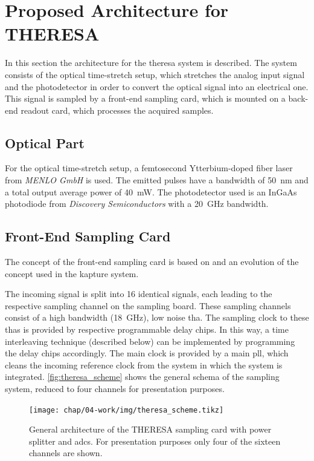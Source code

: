 \section{Proposed Architecture for THERESA}
In this section the architecture for the \gls{theresa} system is described.
The system consists of the optical time-stretch setup, which stretches the analog input signal and the photodetector in order to convert the optical signal into an electrical one.
This signal is sampled by a front-end sampling card, which is mounted on a back-end readout card, which processes the acquired samples.

\subsection*{Optical Part}
For the optical time-stretch setup, a femtosecond Ytterbium-doped fiber laser from \textit{MENLO GmbH} is used. The emitted pulses have a bandwidth of \SI{50}{\nano \meter} and a total output average power of \SI{40}{\milli \watt}.
The photodetector used is an InGaAs photodiode from \textit{Discovery Semiconductors} with a \SI{20}{\GHz} bandwidth.

\subsection{Front-End Sampling Card}
The concept of the front-end sampling card is based on and an evolution of the concept used in the \gls{kapture} system. 

The incoming signal is split into 16 identical signals, each leading to the respective sampling channel on the sampling board.
These sampling channels consist of a high bandwidth (\SI{18}{\GHz}), low noise \gls{tha}.
The sampling clock to these \glspl{tha} is provided by respective programmable delay chips.
In this way, a time interleaving technique (described below) can be implemented by programming the delay chips accordingly. 
The main clock is provided by a main \gls{pll}, which cleans the incoming reference clock from the system in which the system is integrated.
\autoref{fig:theresa_scheme} shows the general schema of the sampling system, reduced to four channels for presentation purposes.
\begin{figure}[H]
	\centering
	\texttt{[image: chap/04-work/img/theresa\_scheme.tikz]}
	\caption[General architecture of the THERESA sampling card]{General architecture of the THERESA sampling card with power splitter and \glspl{adc}. For presentation purposes only four of the sixteen channels are shown.}
	\label{fig:theresa_scheme}
\end{figure}

